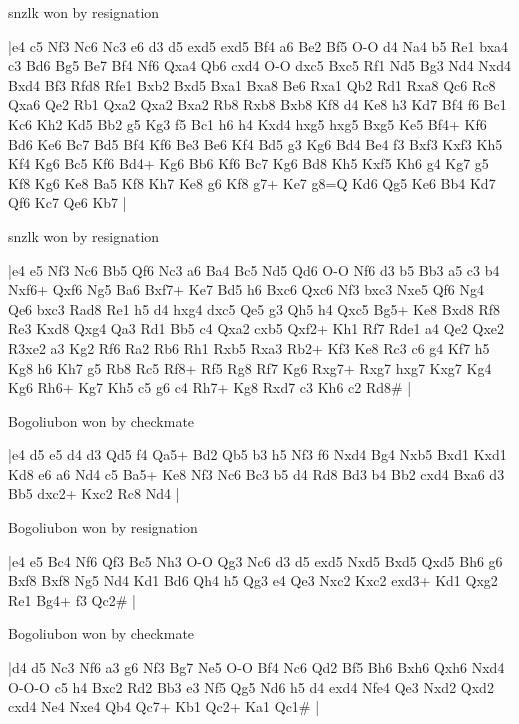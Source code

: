 \showboard

snzlk won by resignation

\makegametitle
|e4 c5 Nf3 Nc6 Nc3 e6 d3 d5 exd5 exd5 Bf4 a6 Be2 Bf5 O-O d4 Na4 b5 Re1 bxa4 c3 Bd6 Bg5 Be7 Bf4 Nf6 Qxa4 Qb6 cxd4 O-O dxc5 Bxc5 Rf1 Nd5 Bg3 Nd4 Nxd4 Bxd4 Bf3 Rfd8 Rfe1 Bxb2 Bxd5 Bxa1 Bxa8 Be6 Rxa1 Qb2 Rd1 Rxa8 Qc6 Rc8 Qxa6 Qe2 Rb1 Qxa2 Qxa2 Bxa2 Rb8 Rxb8 Bxb8 Kf8 d4 Ke8 h3 Kd7 Bf4 f6 Bc1 Kc6 Kh2 Kd5 Bb2 g5 Kg3 f5 Bc1 h6 h4 Kxd4 hxg5 hxg5 Bxg5 Ke5 Bf4+ Kf6 Bd6 Ke6 Bc7 Bd5 Bf4 Kf6 Be3 Be6 Kf4 Bd5 g3 Kg6 Bd4 Be4 f3 Bxf3 Kxf3 Kh5 Kf4 Kg6 Bc5 Kf6 Bd4+ Kg6 Bb6 Kf6 Bc7 Kg6 Bd8 Kh5 Kxf5 Kh6 g4 Kg7 g5 Kf8 Kg6 Ke8 Ba5 Kf8 Kh7 Ke8 g6 Kf8 g7+ Ke7 g8=Q Kd6 Qg5 Ke6 Bb4 Kd7 Qf6 Kc7 Qe6 Kb7  |

\showboard

snzlk won by resignation

\makegametitle
|e4 e5 Nf3 Nc6 Bb5 Qf6 Nc3 a6 Ba4 Bc5 Nd5 Qd6 O-O Nf6 d3 b5 Bb3 a5 c3 b4 Nxf6+ Qxf6 Ng5 Ba6 Bxf7+ Ke7 Bd5 h6 Bxc6 Qxc6 Nf3 bxc3 Nxe5 Qf6 Ng4 Qe6 bxc3 Rad8 Re1 h5 d4 hxg4 dxc5 Qe5 g3 Qh5 h4 Qxc5 Bg5+ Ke8 Bxd8 Rf8 Re3 Kxd8 Qxg4 Qa3 Rd1 Bb5 c4 Qxa2 cxb5 Qxf2+ Kh1 Rf7 Rde1 a4 Qe2 Qxe2 R3xe2 a3 Kg2 Rf6 Ra2 Rb6 Rh1 Rxb5 Rxa3 Rb2+ Kf3 Ke8 Rc3 c6 g4 Kf7 h5 Kg8 h6 Kh7 g5 Rb8 Rc5 Rf8+ Rf5 Rg8 Rf7 Kg6 Rxg7+ Rxg7 hxg7 Kxg7 Kg4 Kg6 Rh6+ Kg7 Kh5 c5 g6 c4 Rh7+ Kg8 Rxd7 c3 Kh6 c2 Rd8\#  |

\showboard

Bogoliubon won by checkmate

\makegametitle
|e4 d5 e5 d4 d3 Qd5 f4 Qa5+ Bd2 Qb5 b3 h5 Nf3 f6 Nxd4 Bg4 Nxb5 Bxd1 Kxd1 Kd8 e6 a6 Nd4 c5 Ba5+ Ke8 Nf3 Nc6 Bc3 b5 d4 Rd8 Bd3 b4 Bb2 cxd4 Bxa6 d3 Bb5 dxc2+ Kxc2 Rc8 Nd4  |

\showboard

Bogoliubon won by resignation

\makegametitle
|e4 e5 Bc4 Nf6 Qf3 Bc5 Nh3 O-O Qg3 Nc6 d3 d5 exd5 Nxd5 Bxd5 Qxd5 Bh6 g6 Bxf8 Bxf8 Ng5 Nd4 Kd1 Bd6 Qh4 h5 Qg3 e4 Qe3 Nxc2 Kxc2 exd3+ Kd1 Qxg2 Re1 Bg4+ f3 Qc2\#  |

\showboard

Bogoliubon won by checkmate

\makegametitle
|d4 d5 Nc3 Nf6 a3 g6 Nf3 Bg7 Ne5 O-O Bf4 Nc6 Qd2 Bf5 Bh6 Bxh6 Qxh6 Nxd4 O-O-O c5 h4 Bxc2 Rd2 Bb3 e3 Nf5 Qg5 Nd6 h5 d4 exd4 Nfe4 Qe3 Nxd2 Qxd2 cxd4 Ne4 Nxe4 Qb4 Qc7+ Kb1 Qc2+ Ka1 Qc1\#  |

